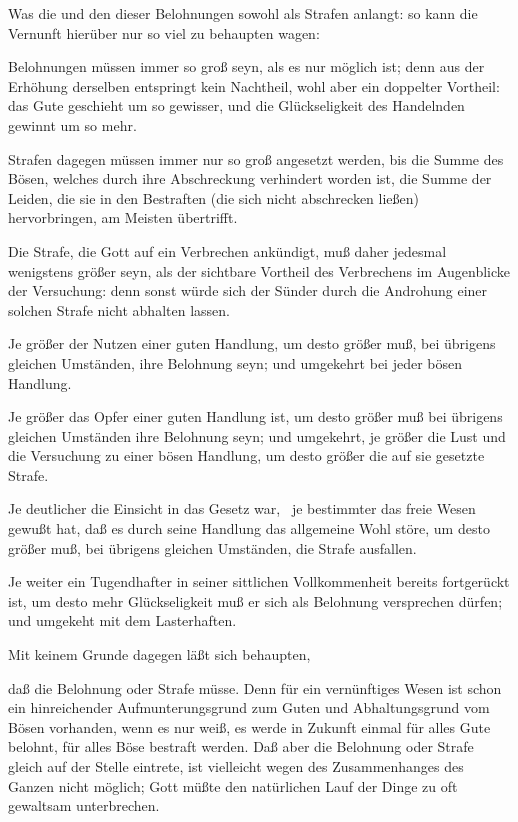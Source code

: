 \begin{aufza}
\begin{RWanm}
\end{RWanm}
\item Was die  und den  dieser Belohnungen sowohl als Strafen anlangt: so kann die Vernunft hierüber nur so viel zu behaupten wagen:
\begin{aufzb}
\item Belohnungen müssen immer so groß seyn, als es nur möglich ist; denn aus der Erhöhung derselben entspringt kein Nachtheil, wohl aber ein doppelter Vortheil: das Gute geschieht um so gewisser, und die Glückseligkeit des Handelnden gewinnt um so mehr.
\item Strafen dagegen müssen immer nur so groß angesetzt werden, bis die Summe des Bösen, welches durch ihre Abschreckung verhindert worden ist, die Summe der Leiden, die sie in den Bestraften (die sich nicht abschrecken ließen) hervorbringen, am Meisten übertrifft.
\item Die Strafe, die Gott auf ein Verbrechen ankündigt, muß daher jedesmal wenigstens größer seyn, als der sichtbare Vortheil des Verbrechens im Augenblicke der Versuchung: denn sonst würde sich der Sünder durch die Androhung einer solchen Strafe nicht abhalten lassen.
\item Je größer der Nutzen einer guten Handlung, um desto größer muß, bei übrigens gleichen Umständen, ihre Belohnung seyn; und umgekehrt bei jeder bösen Handlung.
\item Je größer das Opfer einer guten Handlung ist, um desto größer muß bei übrigens gleichen Umständen ihre Belohnung seyn; und umgekehrt, je größer die Lust und die Versuchung zu einer bösen Handlung, um desto größer die auf sie gesetzte Strafe.
\item Je deutlicher die Einsicht in das Gesetz war, \dh\ je bestimmter das freie Wesen gewußt hat, daß es durch seine Handlung das allgemeine Wohl störe, um desto größer muß, bei übrigens gleichen Umständen, die Strafe ausfallen.
\item Je weiter ein Tugendhafter in seiner sittlichen Vollkommenheit bereits fortgerückt ist, um desto mehr Glückseligkeit muß er sich als Belohnung versprechen dürfen; und umgekeht mit dem Lasterhaften.
\end{aufzb}
\item Mit keinem Grunde dagegen läßt sich behaupten,
\begin{aufzb}
\item daß die Belohnung oder Strafe  müsse. Denn für ein vernünftiges Wesen ist schon ein hinreichender Aufmunterungsgrund zum Guten und Abhaltungsgrund vom Bösen vorhanden, wenn es nur weiß, es werde in Zukunft einmal für alles Gute belohnt, für alles Böse bestraft werden. Daß aber die Belohnung oder Strafe gleich auf der Stelle eintrete, ist vielleicht wegen des Zusammenhanges des Ganzen nicht möglich; Gott müßte den natürlichen Lauf der Dinge zu oft gewaltsam unterbrechen.

\end{aufzb}
\end{aufza}
